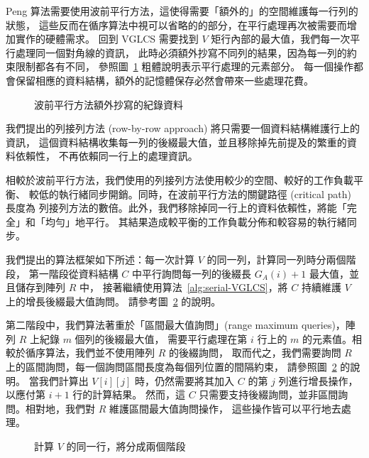 Peng 算法需要使用波前平行方法，這使得需要「額外的」的空間維護每一行列的狀態，
這些反而在循序算法中視可以省略的的部分，在平行處理再次被需要而增加實作的硬體需求。
回到 VGLCS 需要找到 $V$ 矩行內部的最大值，我們每一次平行處理同一個對角線的資訊，
此時必須額外抄寫不同列的結果，因為每一列的約束限制都各有不同，
參照圖~\ref{fig:fig-VGLCS-dp-wavefront} 粗體說明表示平行處理的元素部分。
每一個操作都會保留相應的資料結構，額外的記憶體保存必然會帶來一些處理花費。

\begin{figure}[!thb]
  \centering {} 
  \caption{波前平行方法額外抄寫的紀錄資料}
  \label{fig:fig-VGLCS-dp-wavefront}
\end{figure}

我們提出的列接列方法 (row-by-row approach) 將只需要一個資料結構維護行上的資訊，
這個資料結構收集每一列的後綴最大值，並且移除掉先前提及的繁重的資料依賴性，
不再依賴同一行上的處理資訊。

相較於波前平行方法，我們使用的列接列方法使用較少的空間、較好的工作負載平衡、
較低的執行緒同步開銷。同時，在波前平行方法的關鍵路徑 (critical path) 長度為
列接列方法的數倍。此外，我們移除掉同一行上的資料依賴性，將能「完全」和「均勻」地平行。
其結果造成較平衡的工作負載分佈和較容易的執行緒同步。

我們提出的算法框架如下所述：每一次計算 $V$ 的同一列，計算同一列時分兩個階段，
第一階段從資料結構 $C$ 中平行詢問每一列的後綴長 $G_A(i)+1$ 最大值，並且儲存到陣列 $R$ 中，
接著繼續使用算法~\ref{alg:serial-VGLCS}，將 $C$ 持續維護 $V$ 上的增長後綴最大值詢問。
請參考圖~\ref{fig:fig-VGLCS-dp-rmq} 的說明。

第二階段中，我們算法著重於「區間最大值詢問」(range maximum queries)，陣列 $R$ 上紀錄 $m$ 個列的後綴最大值，
需要平行處理在第 $i$ 行上的 $m$ 的元素值。相較於循序算法，我們並不使用陣列 $R$ 的後綴詢問，
取而代之，我們需要詢問 $R$ 上的區間詢問，每一個詢問區間長度為每個列位置的間隔約束，
請參照圖~\ref{fig:fig-VGLCS-dp-rmq} 的說明。
當我們計算出 $V[i][j]$ 時，仍然需要將其加入 $C$ 的第 $j$ 列進行增長操作，以應付第 $i+1$ 行的計算結果。
然而，這 $C$ 只需要支持後綴詢問，並非區間詢問。相對地，我們對 $R$ 維護區間最大值詢問操作，
這些操作皆可以平行地去處理。

\begin{figure}[!thb]
  \centering {} 
  \caption{計算 $V$ 的同一行，將分成兩個階段}
  \label{fig:fig-VGLCS-dp-rmq}
\end{figure}

